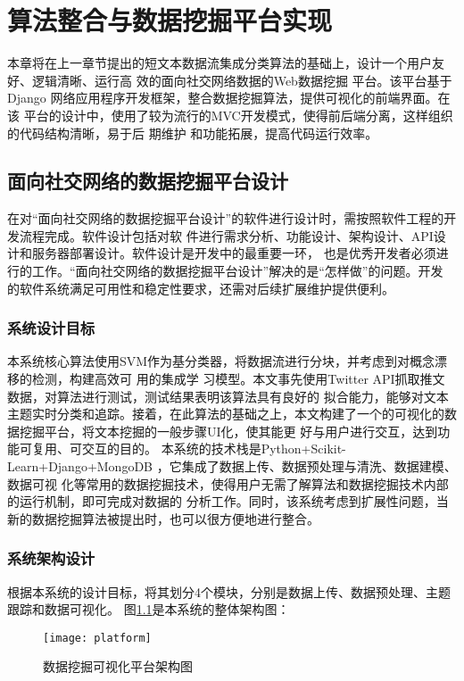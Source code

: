 \chapter{算法整合与数据挖掘平台实现}

本章将在上一章节提出的短文本数据流集成分类算法的基础上，设计一个用户友好、逻辑清晰、运行高
效的面向社交网络数据的Web数据挖掘
平台。该平台基于Django 网络应用程序开发框架，整合数据挖掘算法，提供可视化的前端界面。在该
平台的设计中，使用了较为流行的MVC开发模式，使得前后端分离，这样组织的代码结构清晰，易于后
期维护
和功能拓展，提高代码运行效率。

\section{面向社交网络的数据挖掘平台设计}

在对“面向社交网络的数据挖掘平台设计”的软件进行设计时，需按照软件工程的开发流程完成。软件设计包括对软
件进行需求分析、功能设计、架构设计、API设计和服务器部署设计。软件设计是开发中的最重要一环，
也是优秀开发者必须进行的工作。“面向社交网络的数据挖掘平台设计”解决的是“怎样做”的问题。开发
的软件系统满足可用性和稳定性要求，还需对后续扩展维护提供便利。

\subsection{系统设计目标}
本系统核心算法使用SVM作为基分类器，将数据流进行分块，并考虑到对概念漂移的检测，构建高效可
用的集成学
习模型。本文事先使用Twitter API抓取推文数据，对算法进行测试，测试结果表明该算法具有良好的
拟合能力，能够对文本主题实时分类和追踪。接着，在此算法的基础之上，本文构建了一个的可视化的数据挖掘平台，将文本挖掘的一般步骤UI化，使其能更
好与用户进行交互，达到功能可复用、可交互的目的。
本系统的技术栈是Python+Scikit-Learn+Django+MongoDB ，它集成了数据上传、数据预处理与清洗、数据建模、数据可视
化等常用的数据挖掘技术，使得用户无需了解算法和数据挖掘技术内部的运行机制，即可完成对数据的
分析工作。同时，该系统考虑到扩展性问题，当新的数据挖掘算法被提出时，也可以很方便地进行整合。

\subsection{系统架构设计}
根据本系统的设计目标，将其划分4个模块，分别是数据上传、数据预处理、主题跟踪和数据可视化。
图\ref{fig:platform}是本系统的整体架构图：

\begin{figure}
  \centering
  \texttt{[image: platform]}
  \caption{数据挖掘可视化平台架构图}
  \label{fig:platform}
\end{figure}

